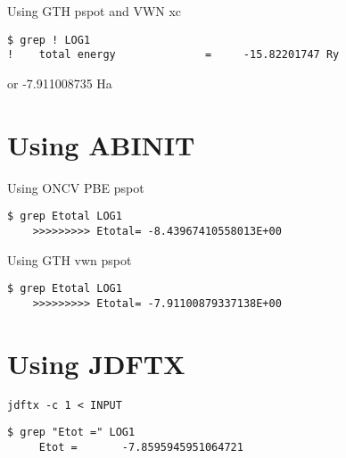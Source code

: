 \documentclass[a4paper]{paper}
\begin{document}
Using GTH pspot and VWN xc
\begin{verbatim}
$ grep ! LOG1 
!    total energy              =     -15.82201747 Ry
\end{verbatim}
or -7.911008735 Ha



\section{Using ABINIT}

Using ONCV PBE pspot
\begin{verbatim}
$ grep Etotal LOG1
    >>>>>>>>> Etotal= -8.43967410558013E+00
\end{verbatim}

Using GTH vwn pspot
\begin{verbatim}
$ grep Etotal LOG1
    >>>>>>>>> Etotal= -7.91100879337138E+00
\end{verbatim}

\section{Using JDFTX}

\begin{verbatim}
jdftx -c 1 < INPUT
\end{verbatim}


\begin{verbatim}
$ grep "Etot =" LOG1 
     Etot =       -7.8595945951064721
\end{verbatim}


\end{document}
